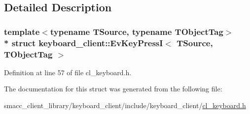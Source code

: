 \subsection{Detailed Description}
\subsubsection*{template$<$typename T\+Source, typename T\+Object\+Tag$>$\\*
struct keyboard\+\_\+client\+::\+Ev\+Key\+Press\+I$<$ T\+Source, T\+Object\+Tag $>$}



Definition at line 57 of file cl\+\_\+keyboard.\+h.



The documentation for this struct was generated from the following file\+:\begin{DoxyCompactItemize}
\item 
smacc\+\_\+client\+\_\+library/keyboard\+\_\+client/include/keyboard\+\_\+client/\hyperlink{cl__keyboard_8h}{cl\+\_\+keyboard.\+h}\end{DoxyCompactItemize}
